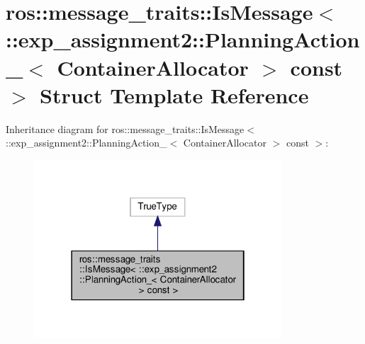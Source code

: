 \hypertarget{structros_1_1message__traits_1_1IsMessage_3_01_1_1exp__assignment2_1_1PlanningAction___3_01ContainerAllocator_01_4_01const_01_4}{}\section{ros\+:\+:message\+\_\+traits\+:\+:Is\+Message$<$ \+:\+:exp\+\_\+assignment2\+:\+:Planning\+Action\+\_\+$<$ Container\+Allocator $>$ const $>$ Struct Template Reference}
\label{structros_1_1message__traits_1_1IsMessage_3_01_1_1exp__assignment2_1_1PlanningAction___3_01ContainerAllocator_01_4_01const_01_4}


Inheritance diagram for ros\+:\+:message\+\_\+traits\+:\+:Is\+Message$<$ \+:\+:exp\+\_\+assignment2\+:\+:Planning\+Action\+\_\+$<$ Container\+Allocator $>$ const $>$\+:
\nopagebreak
\begin{figure}[H]
\begin{center}
\leavevmode
\includegraphics[width=262pt]{structros_1_1message__traits_1_1IsMessage_3_01_1_1exp__assignment2_1_1PlanningAction___3_01Conta4a2f55e24ddb66568d6ede309a64d07b}
\end{center}
\end{figure}


